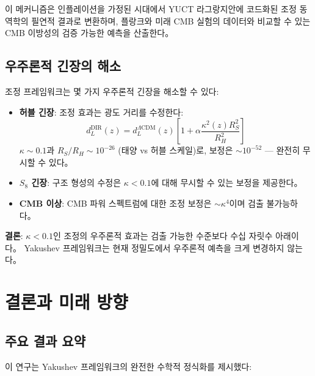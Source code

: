 \documentclass[11pt,a4paper]{article}
\begin{document}
이 메커니즘은 인플레이션을 가정된 시대에서 YUCT 라그랑지안에 코드화된 조정 동역학의 필연적 결과로 변환하며, 플랑크와 미래 CMB 실험의 데이터와 비교할 수 있는 CMB 이방성의 검증 가능한 예측을 산출한다。

\subsection{우주론적 긴장의 해소}

조정 프레임워크는 몇 가지 우주론적 긴장을 해소할 수 있다:

\begin{itemize}
\item \textbf{허블 긴장}: 조정 효과는 광도 거리를 수정한다:
\begin{equation}
	d_L^{\text{DIR}}(z) = d_L^{\Lambda\text{CDM}}(z) \left[ 1 + \alpha \frac{\kappa^2(z) R_S^2}{R_H^2} \right]
\end{equation}
$\kappa \sim 0.1$과 $R_S/R_H \sim 10^{-26}$ (태양 vs 허블 스케일)로, 보정은 $\sim 10^{-52}$ — 완전히 무시할 수 있다。

\item \textbf{$S_8$ 긴장}: 구조 형성의 수정은 $\kappa < 0.1$에 대해 무시할 수 있는 보정을 제공한다。

\item \textbf{CMB 이상}: CMB 파워 스펙트럼에 대한 조정 보정은 $\sim \kappa^4$이며 검출 불가능하다。
\end{itemize}

\textbf{결론}: $\kappa < 0.1$인 조정의 우주론적 효과는 검출 가능한 수준보다 수십 자릿수 아래이다。 Yakushev 프레임워크는 현재 정밀도에서 우주론적 예측을 크게 변경하지 않는다。

\section{결론과 미래 방향}
\subsection{주요 결과 요약}

이 연구는 Yakushev 프레임워크의 완전한 수학적 정식화를 제시했다:
\end{document}
